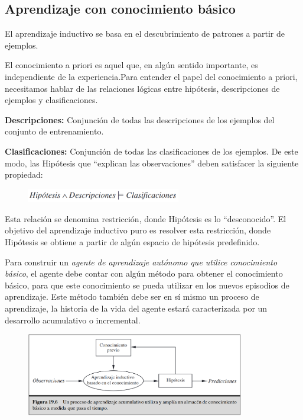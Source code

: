 \documentclass[12 pt, a4paper]{article}
\begin{document}
	 	\subsection{Aprendizaje con conocimiento básico}
	 		El aprendizaje inductivo se basa en el descubrimiento de patrones a partir de ejemplos.
			
			El conocimiento a priori es aquel que, en algún sentido importante, es independiente de la experiencia.Para entender el papel del conocimiento a priori, necesitamos hablar de las relaciones lógicas entre hipótesis, descripciones de ejemplos y clasificaciones.
			
			\textbf{Descripciones:} Conjunción de todas las descripciones de los ejemplos del conjunto de entrenamiento.
			
			\textbf{Clasificaciones:} Conjunción de todas las clasificaciones de los ejemplos.
De este modo, las Hipótesis que ``explican las observaciones'' deben satisfacer la siguiente propiedad:
				
				\begin{figure}[h]
					\centering
					\includegraphics[width=0.6\textwidth]{./section2/fig1.png}
				\end{figure}
			
			Esta relación se denomina restricción, donde Hipótesis es lo ``desconocido''.  El objetivo del aprendizaje inductivo puro es resolver esta restricción, donde Hipótesis se obtiene a partir de algún espacio de hipótesis predefinido.
			
			Para construir un \emph{agente de aprendizaje autónomo que utilice conocimiento básico}, el agente debe contar con algún método para obtener el conocimiento básico, para que este conocimiento se pueda utilizar en los nuevos episodios de aprendizaje. Este método también debe ser en sí mismo un proceso de aprendizaje, la historia de la vida del agente estará caracterizada por un desarrollo acumulativo o incremental.
				\begin{figure}[h]
					\centering
					\includegraphics[width=0.85\textwidth]{./section2/fig2.png}
				\end{figure}
\end{document}
